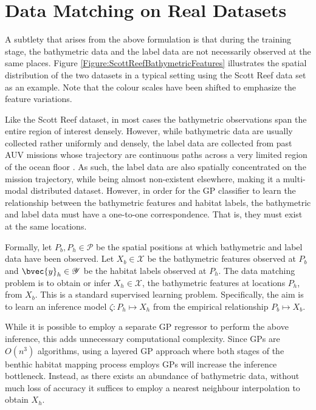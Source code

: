 	\section{Data Matching on Real Datasets}
	\label{Appendix:BathymetricFeatureExtraction:DataMatching}
	
		A subtlety that arises from the above formulation is that during the training stage, the bathymetric data and the label data are not necessarily observed at the same places. Figure \ref{Figure:ScottReefBathymetricFeatures} illustrates the spatial distribution of the two datasets in a typical setting using the Scott Reef data set \citep{IMOS} as an example. Note that the colour scales have been shifted to emphasize the feature variations.
		
		Like the Scott Reef dataset, in most cases the bathymetric observations span the entire region of interest densely. However, while bathymetric data are usually collected rather uniformly and densely, the label data are collected from past AUV missions whose trajectory are continuous paths across a very limited region of the ocean floor \citep{Squidle}. As such, the label data are also spatially concentrated on the mission trajectory, while being almost non-existent elsewhere, making it a multi-modal distributed dataset. However, in order for the GP classifier to learn the relationship between the bathymetric features and habitat labels, the bathymetric and label data must have a one-to-one correspondence. That is, they must exist at the same locations. 
		
		Formally, let $P_{b}, P_{h} \in \mathscr{P}$ be the spatial positions at which bathymetric and label data have been observed. Let $X_{b} \in \mathscr{X}$ be the bathymetric features observed at $P_{b}$ and $\bvec{y}_{h} \in \mathscr{Y}$ be the habitat labels observed at $P_{h}$. The data matching problem is to obtain or infer $X_{h} \in \mathscr{X}$, the bathymetric features at locations $P_{h}$, from $X_{b}$. This is a standard supervised learning problem. Specifically, the aim is to learn an inference model $\zeta: P_{h} \mapsto X_{h}$ from the empirical relationship $P_{b} \mapsto X_{b}$.
		
		While it is possible to employ a separate GP regressor to perform the above inference, this adds unnecessary computational complexity. Since GPs are $O(n^{3})$ algorithms, using a layered GP approach where both stages of the benthic habitat mapping process employs GPs will increase the inference bottleneck. Instead, as there exists an abundance of bathymetric data, without much loss of accuracy it suffices to employ a nearest neighbour interpolation to obtain $X_{h}$. 
			
